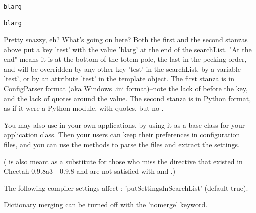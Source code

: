 \begin{verbatim}
blarg

blarg
\end{verbatim}

Pretty snazzy, eh?  What's going on here?  Both the first and the second
stanzas above put a key 'test' with the value 'blarg' at the end of the 
searchList.  "At the end" means it is at the bottom of the totem pole,
the last in the pecking order, and will be overridden by any other key
'test' in the searchList, by a  variable 'test', or by an attribute
'test' in the template object.  The first stanza is in ConfigParser format
(aka Windows .ini format)--note the lack of \code{\$} before the key, and the
lack of quotes around the value.  The
second stanza is in Python format, as if it were a Python module, with
quotes, but no \code{\$}.


You may also use  in your own applications, by using it
as a base class for your application class.  Then your users can keep their
preferences in configuration files, and you can use the 
 methods to parse the files and extract the settings.

( is also meant as a substitute for those who miss the
 directive that existed in Cheetah 0.9.8a3 - 0.9.8 and are not
satisfied with  and .)

The following compiler settings affect :
'putSettingsInSearchList' (default true).

Dictionary merging can be turned off with the 'nomerge' keyword.



